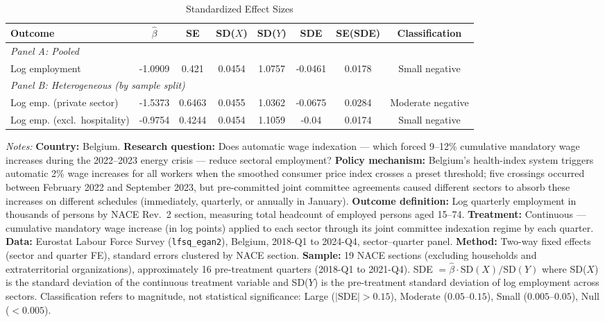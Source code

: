 \begin{table}[t]
\centering
\caption{Standardized Effect Sizes}
\label{tab:sde}
\begin{adjustbox}{max width=\textwidth}
\begin{tabular}{lccccccc}
\hline\hline
Outcome & $\hat{\beta}$ & SE & SD($X$) & SD($Y$) & SDE & SE(SDE) & Classification \\
\hline
\multicolumn{8}{l}{\textit{Panel A: Pooled}} \\
Log employment & -1.0909 & 0.421 & 0.0454 & 1.0757 & -0.0461 & 0.0178 & Small negative \\
\hline
\multicolumn{8}{l}{\textit{Panel B: Heterogeneous (by sample split)}} \\
Log emp. (private sector) & -1.5373 & 0.6463 & 0.0455 & 1.0362 & -0.0675 & 0.0284 & Moderate negative \\
Log emp. (excl.\ hospitality) & -0.9754 & 0.4244 & 0.0454 & 1.1059 & -0.04 & 0.0174 & Small negative \\
\hline\hline
\end{tabular}
\end{adjustbox}
\begin{tablenotes}[flushleft]
\small
\item \textit{Notes:} \textbf{Country:} Belgium. \textbf{Research question:} Does automatic wage indexation --- which forced 9--12\% cumulative mandatory wage increases during the 2022--2023 energy crisis --- reduce sectoral employment? \textbf{Policy mechanism:} Belgium's health-index system triggers automatic 2\% wage increases for all workers when the smoothed consumer price index crosses a preset threshold; five crossings occurred between February 2022 and September 2023, but pre-committed joint committee agreements caused different sectors to absorb these increases on different schedules (immediately, quarterly, or annually in January). \textbf{Outcome definition:} Log quarterly employment in thousands of persons by NACE Rev.~2 section, measuring total headcount of employed persons aged 15--74. \textbf{Treatment:} Continuous --- cumulative mandatory wage increase (in log points) applied to each sector through its joint committee indexation regime by each quarter. \textbf{Data:} Eurostat Labour Force Survey (\texttt{lfsq\_egan2}), Belgium, 2018-Q1 to 2024-Q4, sector--quarter panel. \textbf{Method:} Two-way fixed effects (sector and quarter FE), standard errors clustered by NACE section. \textbf{Sample:} 19 NACE sections (excluding households and extraterritorial organizations), approximately 16 pre-treatment quarters (2018-Q1 to 2021-Q4). SDE $= \hat{\beta} \cdot \text{SD}(X) / \text{SD}(Y)$ where SD($X$) is the standard deviation of the continuous treatment variable and SD($Y$) is the pre-treatment standard deviation of log employment across sectors. Classification refers to magnitude, not statistical significance: Large ($|$SDE$| > 0.15$), Moderate ($0.05$--$0.15$), Small ($0.005$--$0.05$), Null ($< 0.005$).
\end{tablenotes}
\end{table}
